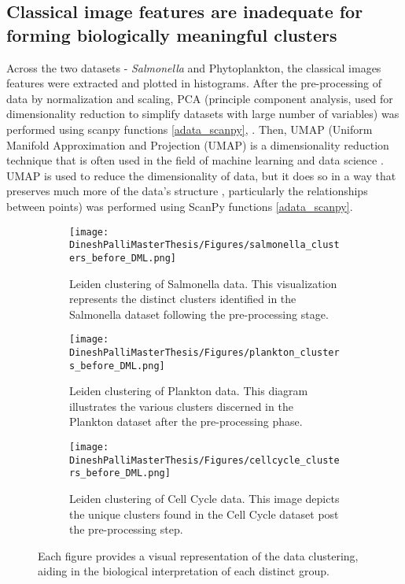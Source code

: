 \documentclass[12pt,a4paper]{article}
\begin{document}
\subsection{Classical image features are inadequate for forming biologically meaningful clusters}
Across the two datasets - \textit{Salmonella} and Phytoplankton, the classical images features were extracted and plotted in histograms. After the pre-processing of data by normalization and scaling, PCA (principle component analysis, used for dimensionality reduction to simplify datasets with large number of variables) was performed using scanpy functions \ref{adata_scanpy}, \cite{pca}. Then, UMAP (Uniform Manifold Approximation and Projection (UMAP) is a dimensionality reduction technique that is often used in the field of machine learning and data science \cite{umap}. UMAP is used to reduce the dimensionality of data, but it does so in a way that preserves much more of the data's structure \cite{umap}, particularly the relationships between points) was performed using ScanPy functions \ref{adata_scanpy}.

\begin{figure}
  \centering
  \begin{subfigure}{\linewidth}
    \texttt{[image: DineshPalliMasterThesis/Figures/salmonella\_clusters\_before\_DML.png]}
    \caption{Leiden clustering of Salmonella data. This visualization represents the distinct clusters identified in the Salmonella dataset following the pre-processing stage.}
    \label{multifig1:image_a}
  \end{subfigure}
  \hfill
  \begin{subfigure}{\linewidth}
    \texttt{[image: DineshPalliMasterThesis/Figures/plankton\_clusters\_before\_DML.png]}
    \caption{Leiden clustering of Plankton data. This diagram illustrates the various clusters discerned in the Plankton dataset after the pre-processing phase.}
    \label{multifig1:image_b}
  \end{subfigure}
  \hfill
  \begin{subfigure}{\linewidth}
    \texttt{[image: DineshPalliMasterThesis/Figures/cellcycle\_clusters\_before\_DML.png]}
    \caption{Leiden clustering of Cell Cycle data. This image depicts the unique clusters found in the Cell Cycle dataset post the pre-processing step.}
    \label{multifig1:image_c}
  \end{subfigure}
  \caption[Data clustering on classical image features]{Each figure provides a visual representation of the data clustering, aiding in the biological interpretation of each distinct group.}
  \label{multifig1:overall_figure}
\end{figure}
\end{document}
